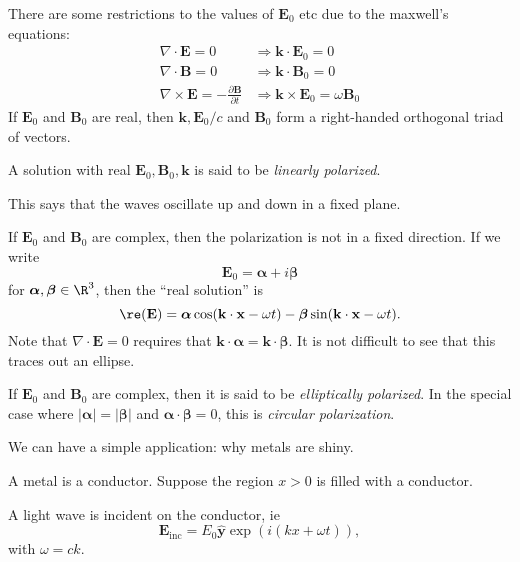\documentclass[a4paper]{article}
\begin{document}
There are some restrictions to the values of $\mathbf{E}_0$ etc due to the maxwell's equations:
\begin{align*}
  \nabla\cdot \mathbf{E} = 0 &\Rightarrow \mathbf{k}\cdot \mathbf{E}_0 = 0\\
  \nabla\cdot \mathbf{B} = 0 &\Rightarrow \mathbf{k}\cdot \mathbf{B}_0 = 0\\
  \nabla\times \mathbf{E} = -\frac{\partial \mathbf{B}}{\partial t} &\Rightarrow \mathbf{k}\times \mathbf{E}_0 = \omega \mathbf{B}_0
\end{align*}
If $\mathbf{E}_0$ and $\mathbf{B}_0$ are real, then $\mathbf{k}, \mathbf{E}_0/c$ and $\mathbf{B}_0$ form a right-handed orthogonal triad of vectors.
\begin{defi}
  A solution with real $\mathbf{E}_0, \mathbf{B}_0, \mathbf{k}$ is said to be \emph{linearly polarized}.
\end{defi}
This says that the waves oscillate up and down in a fixed plane.

If $\mathbf{E}_0$ and $\mathbf{B}_0$ are complex, then the polarization is not in a fixed direction. If we write
\[
  \mathbf{E}_0 = \boldsymbol\alpha + i\boldsymbol\beta
\]
for $\boldsymbol\alpha, \boldsymbol\beta\in \R^3$, then the ``real solution'' is
\[
  \re(\mathbf{E}) = \boldsymbol\alpha\cos(\mathbf{k}\cdot \mathbf{x} - \omega t) - \boldsymbol\beta \sin (\mathbf{k}\cdot \mathbf{x} - \omega t).
\]
Note that $\nabla\cdot \mathbf{E} = 0$ requires that $\mathbf{k}\cdot \boldsymbol\alpha = \mathbf{k}\cdot \boldsymbol\beta$. It is not difficult to see that this traces out an ellipse.
\begin{defi}
  If $\mathbf{E}_0$ and $\mathbf{B}_0$ are complex, then it is said to be \emph{elliptically polarized}. In the special case where $|\boldsymbol\alpha| = |\boldsymbol\beta|$ and $\boldsymbol\alpha \cdot \boldsymbol\beta = 0$, this is \emph{circular polarization}.
\end{defi}

We can have a simple application: why metals are shiny.

A metal is a conductor. Suppose the region $x > 0$ is filled with a conductor.
\begin{center}
\end{center}
A light wave is incident on the conductor, ie
\[
  \mathbf{E}_{\mathrm{inc}} = E_0 \hat{\mathbf{y}} \exp(i(kx + \omega t)),
\]
with $\omega = ck$.
\end{document}
